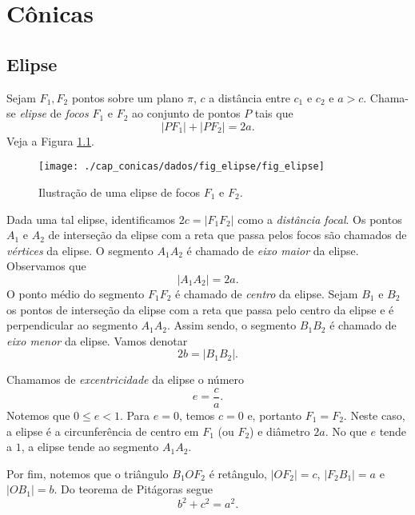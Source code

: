 

\chapter{Cônicas}\label{cap_conicas}
\thispagestyle{fancy}

\section{Elipse}\label{cap_conicas_sec_elipse}

Sejam $F_1,F_2$ pontos sobre um plano $\pi$, $c$ a distância entre $c_1$ e $c_2$ e $a > c$. Chama-se \emph{elipse} de \emph{focos} $F_1$ e $F_2$ ao conjunto de pontos $P$ tais que
\begin{equation}
  |PF_1| + |PF_2| = 2a.
\end{equation}
Veja a Figura \ref{fig:elipse}.

\begin{figure}[H]
  \centering
  \texttt{[image: ./cap\_conicas/dados/fig\_elipse/fig\_elipse]}
  \caption{Ilustração de uma elipse de focos $F_1$ e $F_2$.}
  \label{fig:elipse}
\end{figure}

Dada uma tal elipse, identificamos $2c=|F_1F_2|$ como a \emph{distância focal}. Os pontos $A_1$ e $A_2$ de interseção da elipse com a reta que passa pelos focos são chamados de \emph{vértices} da elipse. O segmento $A_1A_2$ é chamado de \emph{eixo maior} da elipse. Observamos que
\begin{equation}
  |A_1A_2| = 2a.
\end{equation}
O ponto médio do segmento $F_1F_2$ é chamado de \emph{centro} da elipse. Sejam $B_1$ e $B_2$ os pontos de interseção da elipse com a reta que passa pelo centro da elipse e é perpendicular ao segmento $A_1A_2$. Assim sendo, o segmento $B_1B_2$ é chamado de \emph{eixo menor} da elipse. Vamos denotar
\begin{equation}
  2b = |B_1B_2|.
\end{equation}

Chamamos de \emph{excentricidade} da elipse o número
\begin{equation}
  e = \frac{c}{a}.
\end{equation}
Notemos que $0 \leq e < 1$. Para $e=0$, temos $c=0$ e, portanto $F_1=F_2$. Neste caso, a elipse é a circunferência de centro em $F_1$ (ou $F_2$) e diâmetro $2a$. No que $e$ tende a $1$, a elipse tende ao segmento $A_1A_2$.

Por fim, notemos que o triângulo $B_1OF_2$ é retângulo, $|OF_2|=c$, $|F_2B_1|=a$ e $|OB_1|=b$. Do teorema de Pitágoras segue
\begin{equation}\label{eq:elipse_obs}
  b^2 + c^2 = a^2.
\end{equation}

